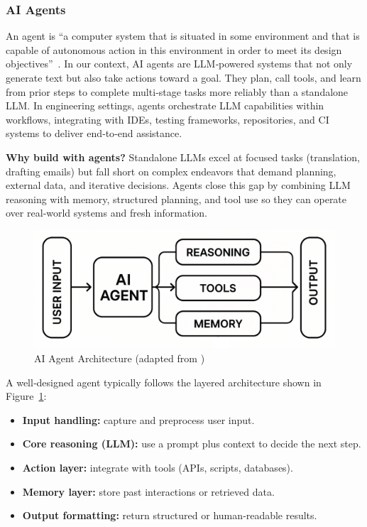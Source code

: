 \begin{spacing}{1.2}
\subsubsection{AI Agents}
An agent is “a computer system that is situated in some environment and that is capable of autonomous action in this environment in order to meet its design objectives”~\cite{wooldridge2009multiagent}. In our context, AI agents are LLM‑powered systems that not only generate text but also take actions toward a goal. They plan, call tools, and learn from prior steps to complete multi‑stage tasks more reliably than a standalone LLM. In engineering settings, agents orchestrate LLM capabilities within workflows, integrating with IDEs, testing frameworks, repositories, and CI systems to deliver end‑to‑end assistance.

\textbf{Why build with agents?} Standalone LLMs excel at focused tasks (translation, drafting emails) but fall short on complex endeavors that demand planning, external data, and iterative decisions. Agents close this gap by combining LLM reasoning with memory, structured planning, and tool use so they can operate over real‑world systems and fresh information.
\begin{figure}[H]
    \centering
    \includegraphics[scale=0.5]{Images/ai_agent.png}
    \caption{AI Agent Architecture (adapted from \cite{yesdani2025agents})}
    \label{fig:ai_agent_workflow}
    \end{figure}

A well‑designed agent typically follows the layered architecture shown in Figure~\ref{fig:ai_agent_workflow}:
\begin{itemize}
\item \textbf{Input handling:} capture and preprocess user input.
\item \textbf{Core reasoning (LLM):} use a prompt plus context to decide the next step.
\item \textbf{Action layer:} integrate with tools (APIs, scripts, databases).
\item \textbf{Memory layer:} store past interactions or retrieved data.
\item \textbf{Output formatting:} return structured or human‑readable results.
\end{itemize}



\end{spacing}
